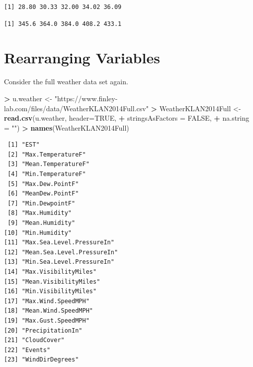 \documentclass[
]{krantz}
\makeatletter
\newenvironment{Shaded}{\begin{snugshade}}{\end{snugshade}}
\newcommand{\DataTypeTok}[1]{\textcolor[rgb]{0.27,0.27,0.27}{#1}}
\newcommand{\DecValTok}[1]{\textcolor[rgb]{0.06,0.06,0.06}{#1}}
\newcommand{\KeywordTok}[1]{\textcolor[rgb]{0.27,0.27,0.27}{\textbf{#1}}}
\newcommand{\NormalTok}[1]{#1}
\newcommand{\OperatorTok}[1]{\textcolor[rgb]{0.43,0.43,0.43}{\textbf{#1}}}
\newcommand{\OtherTok}[1]{\textcolor[rgb]{0.37,0.37,0.37}{#1}}
\newcommand{\StringTok}[1]{\textcolor[rgb]{0.5,0.5,0.5}{#1}}
\newenvironment{kframe}{%
\medskip{}
\setlength{\fboxsep}{.8em}
 \def\at@end@of@kframe{}%
 \ifinner\ifhmode%
  \def\at@end@of@kframe{\end{minipage}}%
  \begin{minipage}{\columnwidth}%
 \fi\fi%
 \def\FrameCommand##1{\hskip\@totalleftmargin \hskip-\fboxsep
 \colorbox{shadecolor}{##1}\hskip-\fboxsep
     \hskip-\linewidth \hskip-\@totalleftmargin \hskip\columnwidth}%
 \MakeFramed {\advance\hsize-\width
   \@totalleftmargin\z@ \linewidth\hsize
   \@setminipage}}%
 {\par\unskip\endMakeFramed%
 \at@end@of@kframe}
\renewenvironment{Shaded}{\begin{kframe}}{\end{kframe}}
\makeatother
\begin{document}
\begin{verbatim}
[1] 28.80 30.33 32.00 34.02 36.09
\end{verbatim}

\begin{Shaded}
\end{Shaded}

\begin{verbatim}
[1] 345.6 364.0 384.0 408.2 433.1
\end{verbatim}

\hypertarget{rearranging-variables}{%
\section{Rearranging Variables}\label{rearranging-variables}}

Consider the full weather data set again.

\begin{Shaded}
\begin{Highlighting}[]
\OperatorTok{\textgreater{}}\StringTok{ }\NormalTok{u.weather \textless{}{-}}\StringTok{ "https://www.finley{-}lab.com/files/data/WeatherKLAN2014Full.csv"}
\OperatorTok{\textgreater{}}\StringTok{ }\NormalTok{WeatherKLAN2014Full \textless{}{-}}\StringTok{ }\KeywordTok{read.csv}\NormalTok{(u.weather, }\DataTypeTok{header=}\OtherTok{TRUE}\NormalTok{, }
\OperatorTok{+}\StringTok{                                 }\DataTypeTok{stringsAsFactors =} \OtherTok{FALSE}\NormalTok{,}
\OperatorTok{+}\StringTok{                                 }\DataTypeTok{na.string =} \StringTok{""}\NormalTok{)}
\OperatorTok{\textgreater{}}\StringTok{ }\KeywordTok{names}\NormalTok{(WeatherKLAN2014Full)}
\end{Highlighting}
\end{Shaded}

\begin{verbatim}
 [1] "EST"                      
 [2] "Max.TemperatureF"         
 [3] "Mean.TemperatureF"        
 [4] "Min.TemperatureF"         
 [5] "Max.Dew.PointF"           
 [6] "MeanDew.PointF"           
 [7] "Min.DewpointF"            
 [8] "Max.Humidity"             
 [9] "Mean.Humidity"            
[10] "Min.Humidity"             
[11] "Max.Sea.Level.PressureIn" 
[12] "Mean.Sea.Level.PressureIn"
[13] "Min.Sea.Level.PressureIn" 
[14] "Max.VisibilityMiles"      
[15] "Mean.VisibilityMiles"     
[16] "Min.VisibilityMiles"      
[17] "Max.Wind.SpeedMPH"        
[18] "Mean.Wind.SpeedMPH"       
[19] "Max.Gust.SpeedMPH"        
[20] "PrecipitationIn"          
[21] "CloudCover"               
[22] "Events"                   
[23] "WindDirDegrees"           
\end{verbatim}
\end{document}
